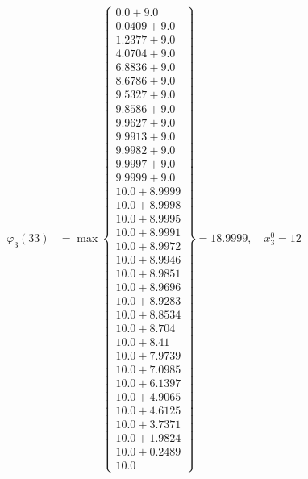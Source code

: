 \documentclass{article}
\begin{document}
\begin{align*}
\varphi_{3}(33) &= \max \left\{ \begin{array}{c}
0.0 + 9.0 \\
 0.0409 + 9.0 \\
 1.2377 + 9.0 \\
 4.0704 + 9.0 \\
 6.8836 + 9.0 \\
 8.6786 + 9.0 \\
 9.5327 + 9.0 \\
 9.8586 + 9.0 \\
 9.9627 + 9.0 \\
 9.9913 + 9.0 \\
 9.9982 + 9.0 \\
 9.9997 + 9.0 \\
 9.9999 + 9.0 \\
 10.0 + 8.9999 \\
 10.0 + 8.9998 \\
 10.0 + 8.9995 \\
 10.0 + 8.9991 \\
 10.0 + 8.9972 \\
 10.0 + 8.9946 \\
 10.0 + 8.9851 \\
 10.0 + 8.9696 \\
 10.0 + 8.9283 \\
 10.0 + 8.8534 \\
 10.0 + 8.704 \\
 10.0 + 8.41 \\
 10.0 + 7.9739 \\
 10.0 + 7.0985 \\
 10.0 + 6.1397 \\
 10.0 + 4.9065 \\
 10.0 + 4.6125 \\
 10.0 + 3.7371 \\
 10.0 + 1.9824 \\
 10.0 + 0.2489 \\
 10.0
\end{array} \right\}=18.9999, \quad x_{3}^0=12\\
  

\end{align*}
\end{document}
